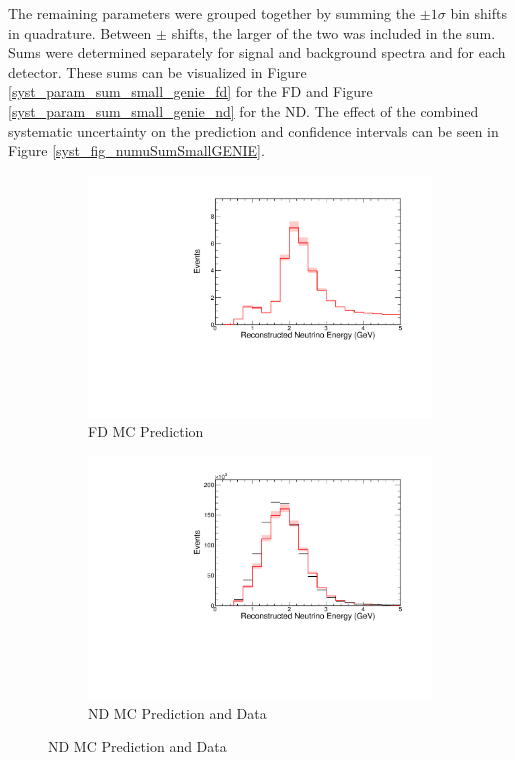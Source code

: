 {The remaining parameters were grouped together by summing the
$\pm1\sigma$  bin shifts in quadrature.
Between $\pm$ shifts, the larger of the two was included in the sum.
Sums were determined separately for signal and background spectra and
for each detector.
These sums can be visualized in Figure \ref{syst_param_sum_small_genie_fd} for
the FD and Figure \ref{syst_param_sum_small_genie_nd} for the ND.
The effect of the combined systematic uncertainty on the
prediction and confidence intervals can be seen in Figure
\ref{syst_fig_numuSumSmallGENIE}.


\begin{figure}
\begin{center}
\begin{subfigure}[c]{0.49\textwidth}
\includegraphics[width=\textwidth]{figures/systs/prediction/fd_mc_prediction_MaCCQE.pdf}
\caption*{FD MC Prediction}
\end{subfigure}
\begin{subfigure}[c]{0.49\textwidth}
\includegraphics[width=\textwidth]{figures/systs/prediction/nd_mc_prediction_MaCCQE.pdf}
\caption*{ND MC Prediction and Data}
\end{subfigure}


\end{center}
\end{figure}}
